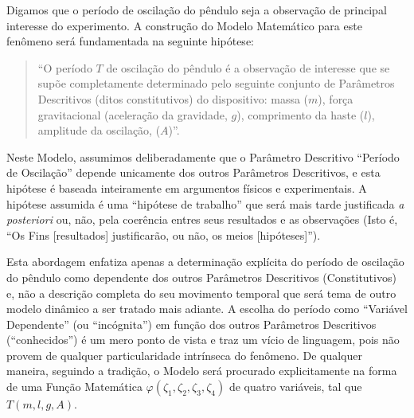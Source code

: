     Digamos que o período de oscilação do pêndulo seja a observação de principal interesse do experimento. A construção do Modelo Matemático para este fenômeno será fundamentada na seguinte hipótese:
    \begin{quotation}
    ``O período \(T\) de oscilação do pêndulo é a observação de interesse que se supõe completamente determinado pelo seguinte conjunto de Parâmetros Descritivos (ditos constitutivos) do dispositivo: massa (\(m\)), força gravitacional (aceleração da gravidade, \(g\)), comprimento da haste (\(l\)), amplitude da oscilação, (\(A\))''.
    \end{quotation}

    Neste Modelo, assumimos deliberadamente que o Parâmetro Descritivo ``Período de Oscilação'' depende unicamente dos outros Parâmetros Descritivos, e esta hipótese é baseada inteiramente em argumentos físicos e experimentais. A hipótese assumida é uma ``hipótese de trabalho'' que será mais tarde justificada \textit{a posteriori} ou, não, pela coerência entres seus resultados e as observações (Isto é, ``Os Fins [resultados] justificarão, ou não, os meios [hipóteses]'').

    Esta abordagem enfatiza apenas a determinação explícita do período de oscilação do pêndulo como dependente dos outros Parâmetros Descritivos (Constitutivos) e, não a descrição completa do seu movimento temporal que será tema de outro modelo dinâmico a ser tratado mais adiante. A escolha do período como ``Variável Dependente'' (ou ``incógnita'') em função dos outros Parâmetros Descritivos (``conhecidos'') é um mero ponto de vista e traz um vício de linguagem, pois não provem de qualquer particularidade intrínseca do fenômeno. De qualquer maneira, seguindo a tradição, o Modelo será procurado explicitamente na forma de uma Função Matemática \(\varphi(\zeta_1, \zeta_2, \zeta_3, \zeta_4)\) de quatro variáveis, tal que \(T(m, l, g, A)\).

